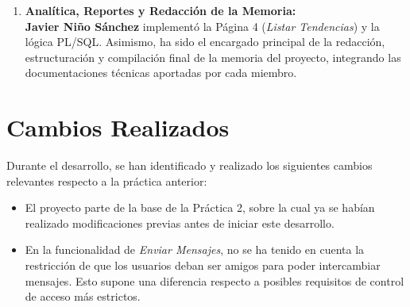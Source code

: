 \begin{enumerate}
    \item \textbf{Analítica, Reportes y Redacción de la Memoria:} \\
    \textbf{Javier Niño Sánchez} implementó la Página 4 (\textit{Listar Tendencias}) y la lógica PL/SQL. Asimismo, ha sido el encargado principal de la redacción, estructuración y compilación final de la memoria del proyecto, integrando las documentaciones técnicas aportadas por cada miembro.
\end{enumerate}

\section*{Cambios Realizados}

Durante el desarrollo, se han identificado y realizado los siguientes cambios relevantes respecto a la práctica anterior:

\begin{itemize}
    \item El proyecto parte de la base de la Práctica 2, sobre la cual ya se habían realizado modificaciones previas antes de iniciar este desarrollo.
    \item En la funcionalidad de \textit{Enviar Mensajes}, no se ha tenido en cuenta la restricción de que los usuarios deban ser amigos para poder intercambiar mensajes. Esto supone una diferencia respecto a posibles requisitos de control de acceso más estrictos.
\end{itemize}
